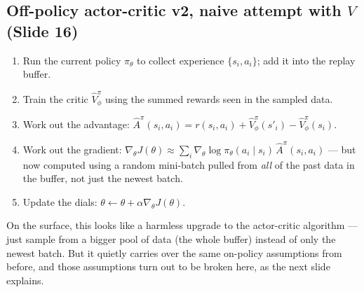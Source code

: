 \documentclass[11pt]{article}
\begin{document}
\subsection{Off-policy actor-critic v2, naive attempt with $V$ (Slide 16)}
\begin{enumerate}[leftmargin=*]
  \item Run the current policy $\pi_\theta$ to collect experience $\{s_i,a_i\}$; add it into the replay buffer.
  \item Train the critic $\hat V^\pi_\phi$ using the summed rewards seen in the sampled data.
  \item Work out the advantage: $\hat A^\pi(s_i,a_i) = r(s_i,a_i) + \hat V^\pi_\phi(s'_i) - \hat V^\pi_\phi(s_i)$.
  \item Work out the gradient: $\nabla_\theta J(\theta) \approx \sum_i \nabla_\theta \log\pi_\theta(a_i\mid s_i)\,\hat A^\pi(s_i,a_i)$ --- but now computed using a random mini-batch pulled from \emph{all} of the past data in the buffer, not just the newest batch.
  \item Update the dials: $\theta \leftarrow \theta + \alpha\nabla_\theta J(\theta)$.
\end{enumerate}
On the surface, this looks like a harmless upgrade to the actor-critic algorithm --- just sample from a bigger pool of data (the whole buffer) instead of only the newest batch. But it quietly carries over the same on-policy assumptions from before, and those assumptions turn out to be broken here, as the next slide explains.
\end{document}
